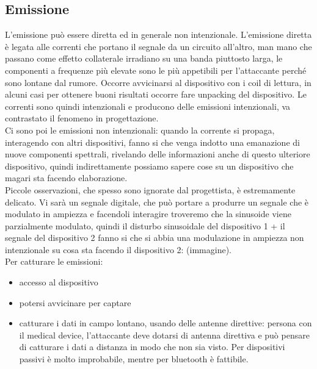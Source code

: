\documentclass[oneside, 12pt]{extbook}
\begin{document}
\subsection{Emissione}
L'emissione può essere diretta ed in generale non intenzionale. L'emissione diretta è legata alle correnti che portano il segnale da un circuito all'altro, man mano che passano come effetto collaterale irradiano su una banda piuttosto larga, le componenti a frequenze più elevate sono le più appetibili per l'attaccante perché sono lontane dal rumore. Occorre avvicinarsi al dispositivo con i coil di lettura, in alcuni casi per ottenere buoni risultati occorre fare unpacking del dispositivo. Le correnti sono quindi intenzionali e producono delle emissioni intenzionali, va contrastato il fenomeno in progettazione.\\Ci sono poi le emissioni non intenzionali: quando la corrente si propaga, interagendo con altri dispositivi, fanno si che venga indotto una emanazione di nuove componenti spettrali, rivelando delle informazioni anche di questo ulteriore dispositivo, quindi indirettamente possiamo sapere cose su un dispositivo che magari sta facendo elaborazione.\\Piccole osservazioni, che spesso sono ignorate dal progettista, è estremamente delicato. Vi sarà un segnale digitale, che può portare a produrre un segnale che è modulato in ampiezza e facendoli interagire troveremo che la sinusoide viene parzialmente modulato, quindi il disturbo sinusoidale del dispositivo 1 + il segnale del dispositivo 2 fanno si che si abbia una modulazione in ampiezza non intenzionale su cosa sta facendo il dispositivo 2: (immagine).\\Per catturare le emissioni:
\begin{itemize}
	\item accesso al dispositivo
	\item potersi avvicinare per captare
	\item catturare i dati in campo lontano, usando delle antenne direttive: persona con il medical device, l'attaccante deve dotarsi di antenna direttiva e può pensare di catturare i dati a distanza in modo che non sia visto. Per dispositivi passivi è molto improbabile, mentre per bluetooth è fattibile.
\end{itemize}
\end{document}
